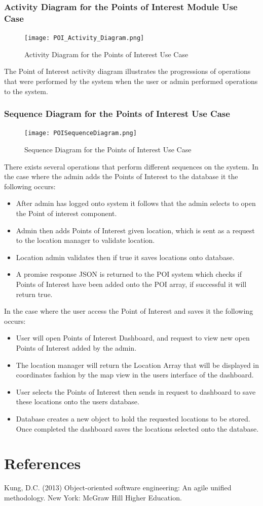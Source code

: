 \documentclass[runningheads,a4paper]{article}
\begin{document}
\subsubsection {Activity Diagram for the Points of Interest Module Use Case}
 	\begin{figure}[H]
   	\centering
   	\texttt{[image: POI\_Activity\_Diagram.png]}
   	\caption{Activity Diagram for the Points of Interest Use Case}
	\end{figure}
	
	The Point of Interest activity diagram illustrates the progressions of operations that were performed by the system when the user or admin performed operations to the system. 
	 
\subsubsection {Sequence Diagram for the Points of Interest Use Case}
 	\begin{figure}[H]
   	\centering
   	\texttt{[image: POISequenceDiagram.png]}
   	\caption{Sequence Diagram for the Points of Interest Use Case}
	\end{figure}
	There exists several operations that perform different sequences on the system.
	In the case where the admin adds the Points of Interest to the database it the following occurs:
	\begin{itemize}
		\item  After admin has logged onto system it follows that the admin selects to open the Point of interest component.
		\item Admin then adds Points of Interest given location, which is sent as a request to the location manager to validate location. 
		\item Location admin validates then if true it saves locations onto database.
		\item A promise response JSON is returned to the POI system which checks if Points of Interest have been added onto the POI array, if successful it will return true.
	\end{itemize}
	
	In the case where the user access the Point of Interest and saves it the following occurs:
	\begin{itemize}
		\item  User will open Points of Interest Dashboard, and request to view new open Points of Interest added by the admin. 
		\item The location manager will return the Location Array that will be displayed in coordinates fashion by the map view in the users interface of the dashboard.  
		\item User selects the Points of Interest then sends in request to dashboard to save these locations onto the users database.
		\item Database creates a new object to hold the requested locations to be stored. Once completed the dashboard saves the locations selected onto the database.
	\end{itemize}
	


\section{References}

Kung, D.C. (2013) Object-oriented software engineering: An agile unified methodology. New York: McGraw Hill Higher Education.
\end{document}
